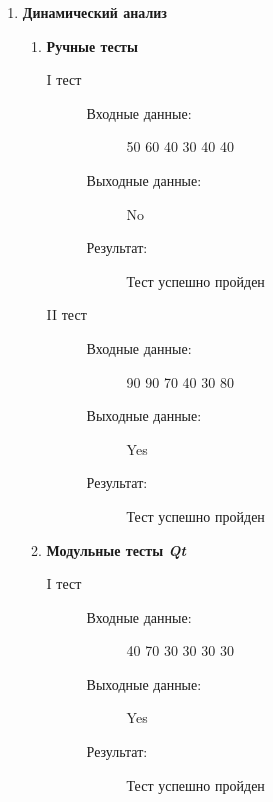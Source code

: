 \documentclass[12pt,a4paper]{report}
\begin{document}
\begin{enumerate}

\item \textbf{Динамический анализ}
\begin{enumerate}
\item \textbf{Ручные тесты}
\begin{description}
\item[I тест]
\hspace{\parindent}
\begin{flushleft}
\begin{description}
\item[Входные данные:] 50 60 40 30 40 40
\item[Выходные данные:] No
\item[Результат:] Тест успешно пройден
\end{description}
\end{flushleft}
\end{description}

\begin{description}
\item[II тест]
\hspace{\parindent}
\begin{flushleft}
\begin{description}
\item[Входные данные:] 90 90 70 40 30 80
\item[Выходные данные:] Yes
\item[Результат:] Тест успешно пройден
\end{description}
\end{flushleft}
\end{description}

\item \textbf{Модульные тесты \textit{Qt}}
\begin{description}
\item[I тест]
\hspace{\parindent}
\begin{flushleft}
\begin{description}
\item[Входные данные:] 40 70 30 30 30 30
\item[Выходные данные:] Yes
\item[Результат:] Тест успешно пройден
\end{description}
\end{flushleft}
\end{description}


\end{enumerate}
\end{enumerate}
\end{document}
